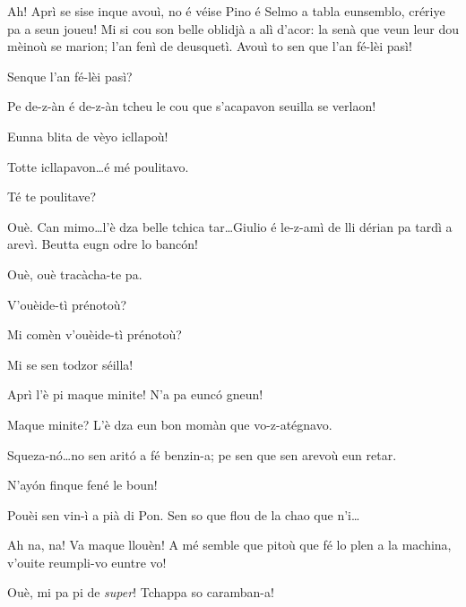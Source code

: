 \begin{drama}
\Bertaspeaks Ah! Aprì se sise inque avouì, no é véise Pino é Selmo a tabla eunsemblo, crériye pa a seun joueu! Mi si cou son belle oblidjà a alì d'acor: la senà que veun leur dou mèinoù se marion; l'an fenì de deusquetì. Avouì to sen que l'an fé-lèi pasì!

\Helenespeaks Senque l'an fé-lèi pasì?

\Bertaspeaks Pe de-z-àn é de-z-àn tcheu le cou que s'acapavon seuilla se verlaon!

\Dorinaspeaks Eunna blita de vèyo icllapoù!

\Bertaspeaks Totte icllapavon\ldots é mé poulitavo.

\Helenespeaks Té te poulitave?

\Bertaspeaks Ouè. Can mimo\ldots l'è dza belle tchica tar\ldots Giulio é le-z-amì de lli dérian pa tardì a arevì. Beutta eugn odre lo banc\'on!

\Helenespeaks Ouè, ouè tracàcha-te pa.



\Dorinaspeaks{} V'ouèide-tì prénotoù?

\Federicospeaks{} Mi comèn v'ouèide-tì prénotoù? 

\Marcospeaks Mi se sen todzor séilla! 

\Michelspeaks Aprì l'è pi maque minite! N'a pa eunc\'o gneun!

\Bertaspeaks Maque minite? L'è dza eun bon momàn que vo-z-atégnavo.

\Federicospeaks{} Squeza-n\'o\ldots no sen arit\'o a fé benzin-a; pe sen que sen arevoù eun retar.

\Marcospeaks N'ay\'on finque fené le boun!

\Michelspeaks Pouèi sen vin-ì a pià di Pon.  Sen so que flou de la chao que n'i\ldots


\Dorinaspeaks Ah na, na! Va maque llouèn! A mé semble que pitoù que fé lo plen a la machina, v'ouite reumpli-vo euntre vo!

\Federicospeaks Ouè, mi pa pi de \textit{super}!  Tchappa so caramban-a!


\end{drama}
